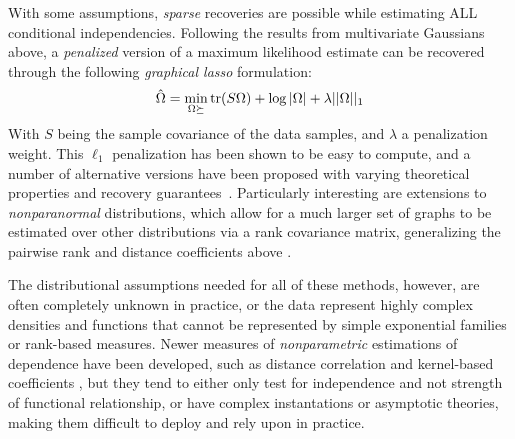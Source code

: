 With some assumptions, \textit{sparse} recoveries are possible while estimating ALL conditional independencies. Following the results from multivariate Gaussians above,
a \textit{penalized} version of a maximum likelihood estimate can be recovered through the following \textit{graphical lasso} \cite{friedman2008sparse} formulation:
\begin{align}\label{eq:glasso}
    \hat{\Omega} = \min_{\Omega \succeq} \operatorname{tr}(S\Omega) + \log|\Omega| + \lambda||\Omega||_1
\end{align}
With $S$ being the sample covariance of the data samples, and $\lambda$ a penalization weight. This $\ell_1$ penalization has been shown to be easy to compute, and a number of alternative versions have been proposed with varying theoretical properties and recovery guarantees~\citep{cai2011constrained,yuan2010high}.
Particularly interesting are extensions to \textit{nonparanormal} distributions, which allow for a much larger set of graphs to be estimated over other distributions via a rank covariance matrix, generalizing the pairwise rank and distance coefficients above \citep{liu2009nonparanormal,xue2012regularized}.

The distributional assumptions needed for all of these methods, however, are often completely unknown in practice, or the data represent highly complex densities and functions that cannot be represented by simple exponential families or rank-based measures.
Newer measures of \textit{nonparametric} estimations of dependence have been developed, such as distance correlation and kernel-based coefficients \cite{szekely2014partial,wang2015conditional,doran2014permutation}, but they tend to either only test for independence and not strength of functional relationship, or have complex instantations or asymptotic theories, making them difficult to deploy and rely upon in practice.

